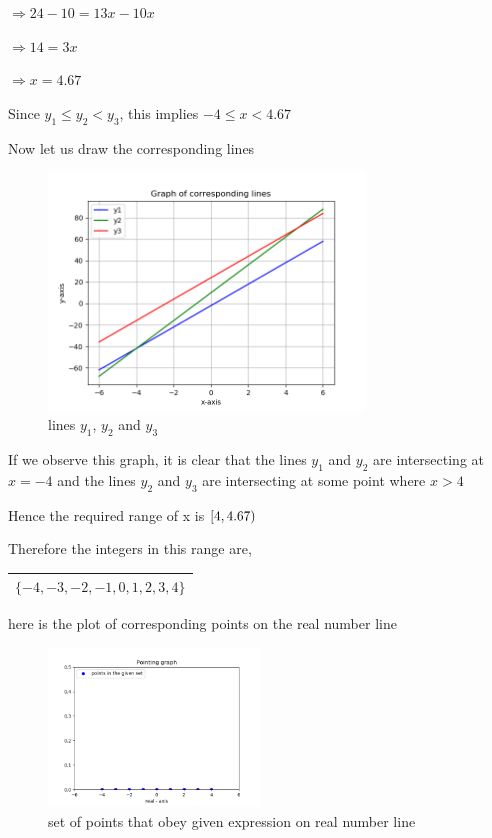 \documentclass[16pt, a4paper]{article}
\begin{document}
$\Rightarrow 24 - 10 = 13x - 10x$

$\Rightarrow 14 = 3x$

$\Rightarrow x = 4.67$


Since $y_1 \leq y_2 < y_3$, this implies $-4 \leq x < 4.67$


Now let us draw the corresponding lines

\begin{figure}[h]
    \centering
    \includegraphics[width = 0.75\textwidth]{Figure_1}
    \caption{lines $y_1$, $y_2$ and $y_3$}
    \label{fig:mesh1}
\end{figure}

If we observe this graph, it is clear that the lines $y_1$ and $y_2$ are intersecting at $x = -4$ and the lines $y_2$ and $y_3$ are intersecting at some point where $x>4$

Hence the required range of x is $[\-4, 4.67)\ $\newline


\vspace{16pt}
Therefore the integers in this range are,

\begin{center}
\begin{tabular}{|c|}
\hline
\textbf{$ \{ -4, -3, -2, -1, 0, 1, 2, 3, 4\}$} \\
\hline
\end{tabular}
\end{center}


here is the plot of corresponding points on the real number line\\
\begin{figure}[h]
    \centering
    \includegraphics[width = 0.5\textwidth]{Figure_2}
    \caption{set of points that obey given expression on real number line}
    \label{fig:mesh1}
\end{figure}
\end{document}
